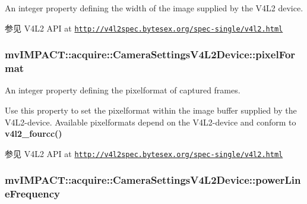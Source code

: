 An integer property defining the width of the image supplied by the V4\+L2 device. 

\begin{DoxySeeAlso}{参见}
V4\+L2 A\+P\+I at \href{http://v4l2spec.bytesex.org/spec-single/v4l2.html}{\tt http\+://v4l2spec.\+bytesex.\+org/spec-\/single/v4l2.\+html} 
\end{DoxySeeAlso}
\hypertarget{classmv_i_m_p_a_c_t_1_1acquire_1_1_camera_settings_v4_l2_device_a86735fd2b340192e2a69242d0cfb7b2f}{
\subsubsection[{pixel\+Format}]{ mv\+I\+M\+P\+A\+C\+T\+::acquire\+::\+Camera\+Settings\+V4\+L2\+Device\+::pixel\+Format}}\label{classmv_i_m_p_a_c_t_1_1acquire_1_1_camera_settings_v4_l2_device_a86735fd2b340192e2a69242d0cfb7b2f}


An integer property defining the pixelformat of captured frames. 

Use this property to set the pixelformat within the image buffer supplied by the V4\+L2-\/device. Available pixelformats depend on the V4\+L2-\/device and conform to {\bfseries v4l2\+\_\+fourcc()} \begin{DoxySeeAlso}{参见}
V4\+L2 A\+P\+I at \href{http://v4l2spec.bytesex.org/spec-single/v4l2.html}{\tt http\+://v4l2spec.\+bytesex.\+org/spec-\/single/v4l2.\+html} 
\end{DoxySeeAlso}
\hypertarget{classmv_i_m_p_a_c_t_1_1acquire_1_1_camera_settings_v4_l2_device_a01aacc2f5d328cbef927d6734f44b784}{
\subsubsection[{power\+Line\+Frequency}]{ mv\+I\+M\+P\+A\+C\+T\+::acquire\+::\+Camera\+Settings\+V4\+L2\+Device\+::power\+Line\+Frequency}}\label{classmv_i_m_p_a_c_t_1_1acquire_1_1_camera_settings_v4_l2_device_a01aacc2f5d328cbef927d6734f44b784}


